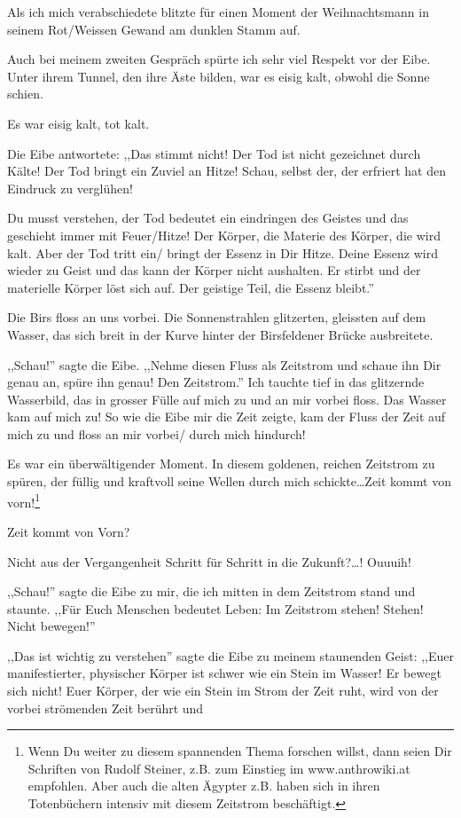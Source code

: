 \documentclass[11pt,titlepage,a5paper]{book}
\begin{document}
Als ich mich verabschiedete blitzte für einen Moment der Weihnachtsmann in seinem Rot/Weissen Gewand am dunklen Stamm auf.

Auch bei meinem zweiten Gespräch spürte ich sehr viel Respekt vor der Eibe. Unter ihrem Tunnel, den ihre Äste bilden, war es eisig kalt, obwohl die Sonne schien.

Es war eisig kalt, tot kalt.

Die Eibe antwortete: ,,Das stimmt nicht! Der Tod ist nicht gezeichnet durch Kälte! Der Tod bringt ein Zuviel an Hitze! Schau, selbst der, der erfriert hat den Eindruck zu verglühen! 

Du musst verstehen, der Tod bedeutet ein eindringen des Geistes und das geschieht immer mit Feuer/Hitze! Der Körper, die Materie des Körper, die wird kalt. Aber der Tod tritt ein/ bringt der Essenz in Dir Hitze. Deine Essenz wird wieder zu Geist und das kann der Körper nicht aushalten. Er stirbt und der materielle Körper löst sich auf. Der geistige Teil, die Essenz bleibt.''

Die Birs floss an uns vorbei. Die Sonnenstrahlen glitzerten, gleissten auf dem Wasser, das sich breit in der Kurve hinter der Birsfeldener Brücke ausbreitete.

,,Schau!'' sagte die Eibe. ,,Nehme diesen Fluss als Zeitstrom und schaue ihn Dir genau an, spüre ihn genau! Den Zeitstrom.'' Ich tauchte tief in das glitzernde Wasserbild, das in grosser Fülle auf mich zu und an mir vorbei floss. Das Wasser kam auf mich zu! So wie die Eibe mir die Zeit zeigte, kam der Fluss der Zeit auf mich zu und floss an mir vorbei/ durch mich hindurch!

Es war ein überwältigender Moment. In diesem goldenen, reichen Zeitstrom zu spüren, der füllig und kraftvoll seine Wellen durch mich schickte\dots Zeit kommt von vorn!\footnote{Wenn Du weiter zu diesem spannenden Thema forschen willst, dann seien Dir Schriften von Rudolf Steiner, z.B. zum Einstieg im www.anthrowiki.at empfohlen. Aber auch die alten Ägypter z.B. haben sich in ihren Totenbüchern intensiv mit diesem Zeitstrom beschäftigt.}

Zeit kommt von Vorn?

Nicht aus der Vergangenheit Schritt für Schritt in die Zukunft?\dots ! Ouuuih!

,,Schau!'' sagte die Eibe zu mir, die ich mitten in dem Zeitstrom stand und staunte. ,,Für Euch Menschen bedeutet Leben: Im Zeitstrom stehen! Stehen! Nicht bewegen!''

,,Das ist wichtig zu verstehen'' sagte die Eibe zu meinem staunenden Geist: ,,Euer manifestierter, physischer Körper ist schwer wie ein Stein im Wasser! Er bewegt sich nicht! Euer Körper, der wie ein Stein im Strom der Zeit ruht, wird von der vorbei strömenden Zeit berührt und
\end{document}
